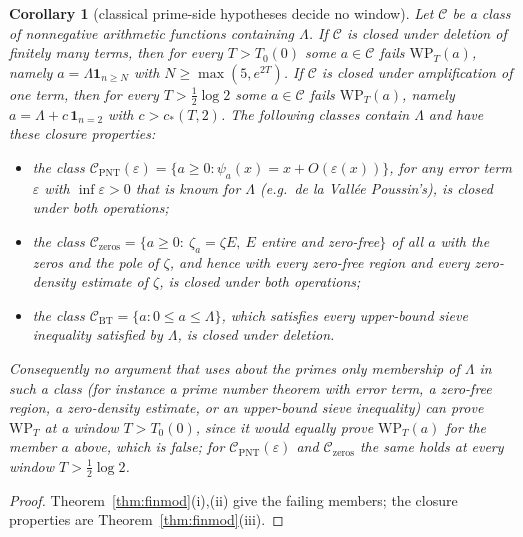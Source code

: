 \documentclass[11pt]{amsart}
\newtheorem{corollary}[theorem]{Corollary}
\theoremstyle{definition}
\theoremstyle{remark}
\begin{document}
\begin{corollary}[classical prime-side hypotheses decide no window]\label{cor:void}
Let $\mathcal C$ be a class of nonnegative arithmetic functions containing $\Lambda$. If $\mathcal C$ is
closed under deletion of finitely many terms, then for every $T>T_0(0)$ some $a\in\mathcal C$ fails
$\mathrm{WP}_T(a)$, namely $a=\Lambda\mathbf 1_{n\ge N}$ with $N\ge\max(5,e^{2T})$. If $\mathcal C$ is closed under
amplification of one term, then for every $T>\frac12\log2$ some $a\in\mathcal C$ fails $\mathrm{WP}_T(a)$, namely
$a=\Lambda+c\,\mathbf 1_{n=2}$ with $c>c_*(T,2)$. The following classes contain $\Lambda$ and have these closure
properties:
\begin{itemize}
\item the class $\mathcal C_{\mathrm{PNT}}(\varepsilon)=\{a\ge0:\psi_a(x)=x+O(\varepsilon(x))\}$, for any error term
$\varepsilon$ with $\inf\varepsilon>0$ that is known for $\Lambda$ (e.g.\ de la Vall\'ee Poussin's), is closed under
both operations;
\item the class $\mathcal C_{\mathrm{zeros}}=\{a\ge0:\ \zeta_a=\zeta E,\ E$ entire and zero-free$\}$ of all $a$ with
the zeros and the pole of $\zeta$, and hence with every zero-free region and every zero-density estimate
of $\zeta$, is closed under both operations;
\item the class $\mathcal C_{\mathrm{BT}}=\{a:0\le a\le\Lambda\}$, which satisfies every upper-bound sieve
inequality satisfied by $\Lambda$, is closed under deletion.
\end{itemize}
Consequently no argument that uses about the primes only membership of $\Lambda$ in such a class (for
instance a prime number theorem with error term, a zero-free region, a zero-density estimate, or an
upper-bound sieve inequality) can prove $\mathrm{WP}_T$ at a window $T>T_0(0)$, since it would equally prove
$\mathrm{WP}_T(a)$ for the member $a$ above, which is false; for $\mathcal C_{\mathrm{PNT}}(\varepsilon)$ and
$\mathcal C_{\mathrm{zeros}}$ the same holds at every window $T>\frac12\log2$.
\end{corollary}
\begin{proof}
Theorem~\ref{thm:finmod}(i),(ii) give the failing members; the closure properties are
Theorem~\ref{thm:finmod}(iii).
\end{proof}
\end{document}
